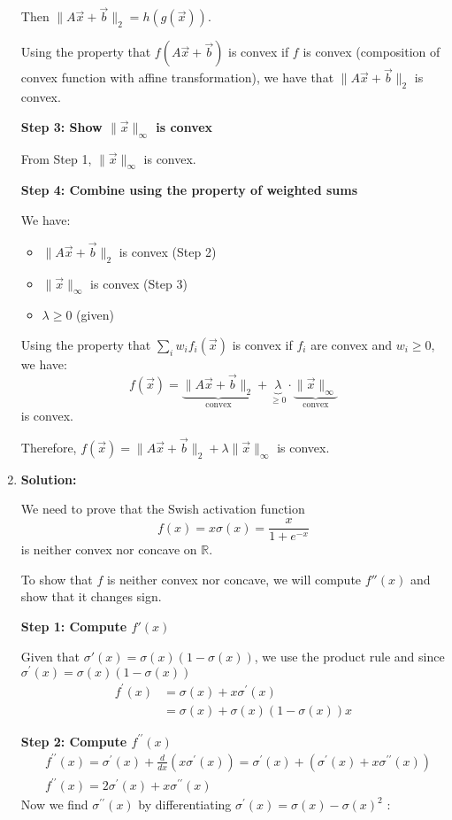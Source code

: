 \begin{enumerate}
    Then $\|A\vec{x} + \vec{b}\|_2 = h(g(\vec{x}))$.
    
    Using the property that $f(A\vec{x} + \vec{b})$ is convex if $f$ is convex (composition of convex function with affine transformation), we have that $\|A\vec{x} + \vec{b}\|_2$ is convex.
    
    \textbf{Step 3: Show $\|\vec{x}\|_\infty$ is convex}
    
    From Step 1, $\|\vec{x}\|_\infty$ is convex.
    
    \textbf{Step 4: Combine using the property of weighted sums}
    
    We have:
    \begin{itemize}
        \item $\|A\vec{x} + \vec{b}\|_2$ is convex (Step 2)
        \item $\|\vec{x}\|_\infty$ is convex (Step 3)
        \item $\lambda \geq 0$ (given)
    \end{itemize}
    
    Using the property that $\sum_i w_i f_i(\vec{x})$ is convex if $f_i$ are convex and $w_i \geq 0$, we have:
    \[
    f(\vec{x}) = \underbrace{\|A\vec{x} + \vec{b}\|_2}_{\text{convex}} + \underbrace{\lambda}_{\geq 0} \cdot \underbrace{\|\vec{x}\|_\infty}_{\text{convex}}
    \]
    is convex.
    
    Therefore, $f(\vec{x}) = \|A\vec{x} + \vec{b}\|_2 + \lambda\|\vec{x}\|_\infty$ is convex.
    
    \item \textbf{Solution:}
    
    We need to prove that the Swish activation function 
    \[
    f(x) = x\sigma(x) = \frac{x}{1 + e^{-x}}
    \]
    is neither convex nor concave on $\mathbb{R}$.
    
    To show that $f$ is neither convex nor concave, we will compute $f''(x)$ and show that it changes sign.
    
    \textbf{Step 1: Compute $f'(x)$}
    
    Given that $\sigma'(x) = \sigma(x)(1 - \sigma(x))$, we use the product rule and since \(\sigma^{'}(x) = \sigma(x)(1 - \sigma(x))\)
    \begin{align*}
        f^{\prime}(x) &= \sigma(x) + x \sigma^{\prime}(x)\\
                      &= \sigma(x) + \sigma(x)(1 - \sigma(x))x
    \end{align*}
    
    \textbf{Step 2: Compute $f^{\prime \prime}(x)$}
    \begin{align*}
        &f^{\prime \prime}(x)=\sigma^{\prime}(x)+\frac{d}{d x}\left(x \sigma^{\prime}(x)\right)=\sigma^{\prime}(x)+\left(\sigma^{\prime}(x)+x \sigma^{\prime \prime}(x)\right)\\
        &f^{\prime \prime}(x)=2 \sigma^{\prime}(x)+x \sigma^{\prime \prime}(x)
    \end{align*}
    Now we find $\sigma^{\prime \prime}(x)$ by differentiating $\sigma^{\prime}(x)=\sigma(x)-\sigma(x)^2$ :


\end{enumerate}
